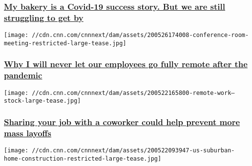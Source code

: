 \hypertarget{my-bakery-is-a-covid-19-success-story-but-we-are-still-struggling-to-get-by}{%
\subsubsection{\texorpdfstring{\href{/2020/05/29/perspectives/bakery-coronavirus-success/index.html}{My
bakery is a Covid-19 success story. But we are still struggling to get
by}}{My bakery is a Covid-19 success story. But we are still struggling to get by}}\label{my-bakery-is-a-covid-19-success-story-but-we-are-still-struggling-to-get-by}}

\href{/2020/05/27/perspectives/fully-remote-workplace/index.html}{}

\texttt{[image: //cdn.cnn.com/cnnnext/dam/assets/200526174008-conference-room-meeting-restricted-large-tease.jpg]}

\hypertarget{why-i-will-never-let-our-employees-go-fully-remote-after-the-pandemic}{%
\subsubsection{\texorpdfstring{\href{/2020/05/27/perspectives/fully-remote-workplace/index.html}{Why
I will never let our employees go fully remote after the
pandemic}}{Why I will never let our employees go fully remote after the pandemic}}\label{why-i-will-never-let-our-employees-go-fully-remote-after-the-pandemic}}

\href{/2020/05/26/perspectives/job-sharing-layoffs/index.html}{}

\texttt{[image: //cdn.cnn.com/cnnnext/dam/assets/200522165800-remote-work---stock-large-tease.jpg]}

\hypertarget{sharing-your-job-with-a-coworker-could-help-prevent-more-mass-layoffs}{%
\subsubsection{\texorpdfstring{\href{/2020/05/26/perspectives/job-sharing-layoffs/index.html}{Sharing
your job with a coworker could help prevent more mass
layoffs}}{Sharing your job with a coworker could help prevent more mass layoffs}}\label{sharing-your-job-with-a-coworker-could-help-prevent-more-mass-layoffs}}

\href{/2020/05/22/perspectives/homeowners-renters-cities-zillow-coronavirus/index.html}{}

\texttt{[image: //cdn.cnn.com/cnnnext/dam/assets/200522093947-us-suburban-home-construction-restricted-large-tease.jpg]}

